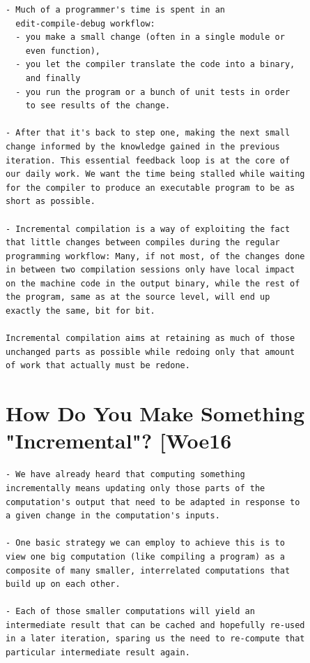 \begin{verbatim}
- Much of a programmer's time is spent in an
  edit-compile-debug workflow:
  - you make a small change (often in a single module or
    even function),
  - you let the compiler translate the code into a binary,
    and finally
  - you run the program or a bunch of unit tests in order
    to see results of the change.

- After that it's back to step one, making the next small
change informed by the knowledge gained in the previous
iteration. This essential feedback loop is at the core of
our daily work. We want the time being stalled while waiting
for the compiler to produce an executable program to be as
short as possible.

- Incremental compilation is a way of exploiting the fact
that little changes between compiles during the regular
programming workflow: Many, if not most, of the changes done
in between two compilation sessions only have local impact
on the machine code in the output binary, while the rest of
the program, same as at the source level, will end up
exactly the same, bit for bit.

Incremental compilation aims at retaining as much of those
unchanged parts as possible while redoing only that amount
of work that actually must be redone.
\end{verbatim}
\cite{rust_blog_incremental_compilation}

\section*{How Do You Make Something "Incremental"? [Woe16}

\begin{verbatim}
- We have already heard that computing something
incrementally means updating only those parts of the
computation's output that need to be adapted in response to
a given change in the computation's inputs.

- One basic strategy we can employ to achieve this is to
view one big computation (like compiling a program) as a
composite of many smaller, interrelated computations that
build up on each other.

- Each of those smaller computations will yield an
intermediate result that can be cached and hopefully re-used
in a later iteration, sparing us the need to re-compute that
particular intermediate result again.
\end{verbatim}
\cite{rust_blog_incremental_compilation}

